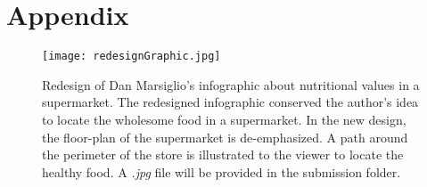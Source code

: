 \section{Appendix}

\begin{figure}[ht]
  \centering
	\texttt{[image: redesignGraphic.jpg]}
	\caption{Redesign of Dan Marsiglio's infographic about nutritional values in a
		supermarket. The redesigned infographic conserved the author's idea to
		locate the wholesome food in a supermarket. In the new design, the
		floor-plan of the supermarket is de-emphasized. A path around the perimeter
		of the store is illustrated to the viewer to locate the healthy food. A
		\textit{.jpg} file will be provided in the submission folder.}
	\label{redesignGraphic}
\end{figure}

